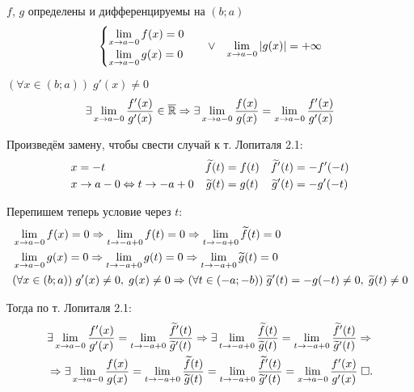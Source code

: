 \documentclass{article}
\begin{document}
\pagebreak

\theorem[Лопиталя 2.2]

$f$, $g$ определены и дифференцируемы на $(b;a)$
\begin{align*}
	\begin{cases}
		\lim\limits_{x\to a-0}f(x)=0 \\
		\lim\limits_{x\to a-0}g(x)=0
	\end{cases} &  & \lor &  & \lim\limits_{x\to a-0}|g(x)|=+\infty
\end{align*}

$(\forall x\in(b;a))\;g'(x)\neq 0$
\begin{align*}
	\exists \lim\limits_{x\to a-0}\frac{f'(x)}{g'(x)}\in\overline{\mathbb{R}}\Rightarrow\exists\lim\limits_{x\to a-0}\frac{f(x)}{g(x)}=\lim\limits_{x\to a-0}\frac{f'(x)}{g'(x)}
\end{align*}

\proof

\newcommand\ft{\widetilde{f}}
\newcommand\gt{\widetilde{g}}

Произведём замену, чтобы свести случай к т. Лопиталя 2.1:
\begin{align*}
	 & x=-t                     & \ft(t) & =f(t) & \ft'(t) & =-f'(-t) \\
	 & x\to a-0\Lrarr t\to -a+0 & \gt(t) & =g(t) & \gt'(t) & =-g'(-t)
\end{align*}

Перепишем теперь условие через $t$:
\begin{align*}
	 & \slim{x\to a-0}f(x)=0\Rarr\slim{t\to -a+0}f(t)=0\Rarr\slim{t\to -a+0}\ft(t)=0                                 \\
	 & \slim{x\to a-0}g(x)=0\Rarr\slim{t\to -a+0}g(t)=0\Rarr\slim{t\to -a+0}\gt(t)=0                                 \\
	 & (\forall x\in(b;a))\;g'(x)\neq 0,\;g(x)\neq 0\Rarr (\forall t\in(-a;-b))\;\gt'(t)=-g(-t)\neq 0,\;\gt(t)\neq 0
\end{align*}

Тогда по т. Лопиталя 2.1:
\begin{align*}
	 & \exists\slim{x\to a-0}\frac{f'(x)}{g'(x)}=\slim{t\to -a+0}\frac{\ft'(t)}{\gt'(t)}\Rarr
	\exists\slim{t\to -a+0}\frac{\ft(t)}{\gt(t)}=\slim{t\to -a+0}\frac{\ft'(t)}{\gt'(t)}\Rarr                                                                            \\
	 & \Rarr\exists\slim{x\to a-0}\frac{f(x)}{g(x)}=\slim{t\to -a+0}\frac{\ft(t)}{\gt(t)}=\slim{t\to -a+0}\frac{\ft'(t)}{\gt'(t)}=\slim{x\to a-0}\frac{f'(x)}{g'(x)}\qed
\end{align*}
\end{document}
